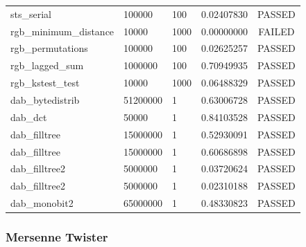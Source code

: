 \documentclass[titlepage, 11pt]{article}
\begin{document}
\begin{table}[!htb]
\begin{tabular}{l|l|l|c|c}
sts\_serial & 100000 & 100 & 0.02407830 & PASSED \\
rgb\_minimum\_distance & 10000 & 1000 & 0.00000000 & FAILED \\
rgb\_permutations & 100000 & 100 & 0.02625257 & PASSED \\
rgb\_lagged\_sum & 1000000 & 100 & 0.70949935 & PASSED \\
rgb\_kstest\_test & 10000 & 1000 & 0.06488329 & PASSED \\
dab\_bytedistrib & 51200000 & 1 & 0.63006728 & PASSED \\
dab\_dct & 50000 & 1 & 0.84103528 & PASSED \\
dab\_filltree & 15000000 & 1 & 0.52930091 & PASSED \\
dab\_filltree & 15000000 & 1 & 0.60686898 & PASSED \\
dab\_filltree2 & 5000000 & 1 & 0.03720624 & PASSED \\
dab\_filltree2 & 5000000 & 1 & 0.02310188 & PASSED \\
dab\_monobit2 & 65000000 & 1 & 0.48330823 & PASSED
\end{tabular}
\end{table}

\newpage
\subsubsection{Mersenne Twister}
\end{document}

